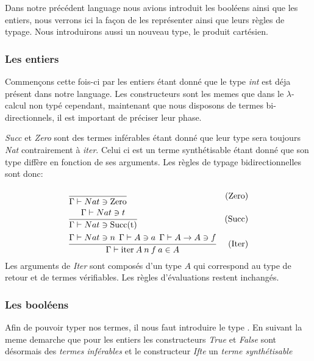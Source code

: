 \documentclass {article}
\theoremstyle{definition}
\theoremstyle{remark}
\begin{document}
Dans notre précédent language nous avions introduit les booléens ainsi que les entiers,
nous verrons ici la façon de les représenter ainsi que leurs règles de typage.
Nous introduirons aussi un nouveau type, le produit cartésien.

\subsubsection{Les entiers}
\label{entier_type}

Commençons cette fois-ci par les entiers étant donné que le type \emph{int}
est déja présent dans notre language.
Les constructeurs sont les memes que dans le \(\lambda\)-calcul non typé 
cependant, maintenant que nous disposons de termes bi-directionnels, il est important
de préciser leur phase.

\emph{Succ} et \emph{Zero} sont des termes inférables étant donné que
leur type sera toujours \emph{Nat} contrairement à \emph{iter}.
Celui ci est un terme synthétisable étant donné que son type diffère en fonction de ses arguments.
Les règles de typage bidirectionnelles sont donc:
\begin{align*}
  &\cfrac{\:}
  {\Gamma\vdash Nat \ni \mathrm{Zero}}&\mbox{(Zero)} \\
  &\cfrac{\Gamma\vdash Nat \ni t}
  {\Gamma\vdash Nat \ni \mathrm{Succ(t)}}&\mbox{(Succ)} \\
  &\cfrac{\Gamma\vdash Nat \ni n \:\: \Gamma\vdash A \ni a \:\: \Gamma\vdash A\rightarrow A \ni f}
  {\Gamma\vdash \mathrm{iter}\: A\: n\: f\: a \in A}&\mbox{(Iter)} \\
\end{align*}
Les arguments de \emph{Iter} sont composés d'un type $A$ qui correspond au type de retour et de termes vérifiables.
Les règles d'évaluations restent inchangés. 

\subsubsection{Les booléens}


Afin de pouvoir typer nos termes, il nous faut introduire le type \bool{}.
En suivant la meme demarche que  pour les entiers les 
constructeurs \emph{True} et \emph{False} sont désormais des \emph{termes inférables}
et le constructeur \emph{Ifte} un \emph{terme synthétisable}
\end{document}
